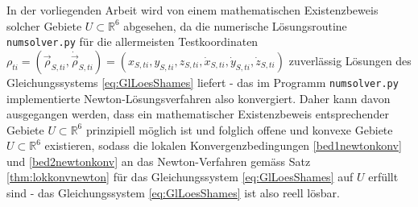 \documentclass[a4paper,12pt]{article}
\numberwithin{equation}{section}
\begin{document}
In der vorliegenden Arbeit wird von einem mathematischen Existenzbeweis solcher Gebiete  $U \subset \mathbb{R}^6$ abgesehen, da die numerische Lösungsroutine \verb|numsolver.py| für die allermeisten Testkoordinaten $\rho_{ti} = (\vec{\rho}_{S,ti},\dot{\vec{\rho}}_{S,ti}) =  (x_{S,ti},y_{S,ti},z_{S,ti},\dot{x}_{S,ti},\dot{y}_{S,ti},\dot{z}_{S,ti})$ zuverlässig Lösungen des Gleichungssystems \eqref{eq:GlLoesShames} liefert - das im Programm \verb|numsolver.py| implementierte Newton-Lösungsverfahren also konvergiert. Daher kann davon ausgegangen werden, dass ein mathematischer Existenzbeweis entsprechender Gebiete $U \subset \mathbb{R}^6$ prinzipiell möglich ist und folglich offene und konvexe Gebiete $U \subset \mathbb{R}^6$ existieren, sodass die lokalen Konvergenzbedingungen \ref{bed1newtonkonv} und \ref{bed2newtonkonv} an das Newton-Verfahren gemäss Satz \ref{thm:lokkonvnewton} für das Gleichungssystem \eqref{eq:GlLoesShames} auf $U$ erfüllt sind - das Gleichungssystem \eqref{eq:GlLoesShames} ist also reell lösbar.
\end{document}
